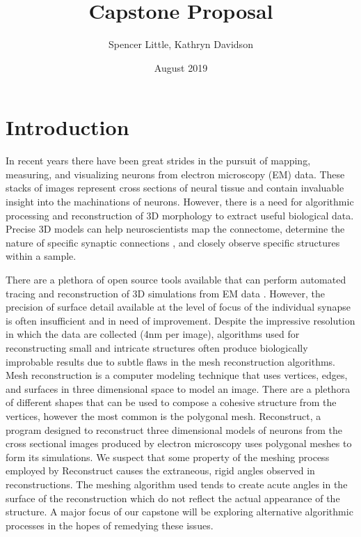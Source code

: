 \documentclass{article}
\title{Capstone Proposal}
\author{Spencer Little, Kathryn Davidson}
\date{August 2019}
\begin{document}
\maketitle

\section{Introduction}

In recent years there have been great strides in the pursuit of mapping, measuring, and visualizing neurons from electron microscopy (EM) data. These stacks of images represent cross sections of neural tissue and contain invaluable insight into the machinations of neurons. However, there is a need for algorithmic processing and reconstruction of 3D morphology to extract useful biological data. Precise 3D models can help neuroscientists map the connectome, determine the nature of specific synaptic connections \cite{abdellah2018neuromorphovis}, and closely observe specific structures within a sample.

There are a plethora of open source tools available that can perform automated tracing and reconstruction of 3D simulations from EM data \cite{gerhard2013segmented}. However, the precision of surface detail available at the level of focus of the individual synapse is often insufficient and in need of improvement. Despite the impressive resolution in which the data are collected (4nm per image), algorithms used for reconstructing small and intricate structures often produce biologically improbable results due to subtle flaws in the mesh reconstruction algorithms. Mesh reconstruction is a computer modeling technique that uses vertices, edges, and surfaces in three dimensional space to model an image. There are a plethora of different shapes that can be used to compose a cohesive structure from the vertices, however the most common is the polygonal mesh. Reconstruct, a program designed to reconstruct three dimensional models of neurons from the cross sectional images produced by electron microscopy uses polygonal meshes to form its simulations. We suspect that some property of the meshing process employed by Reconstruct causes the extraneous, rigid angles observed in reconstructions. The meshing algorithm used tends to create acute angles in the surface of the reconstruction which do not reflect the actual appearance of the structure. A major focus of our capstone will be exploring alternative algorithmic processes in the hopes of remedying these issues.
\end{document}
